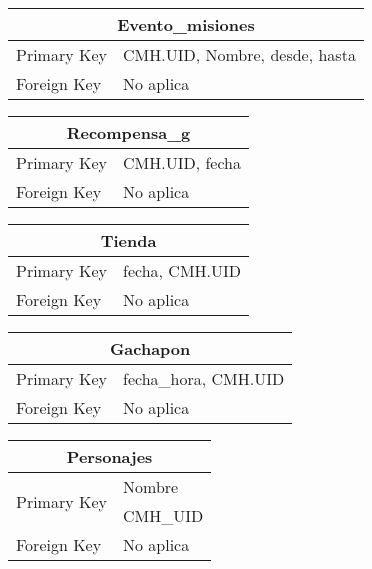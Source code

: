 \documentclass{report}
\begin{document}
\begin{center}    
    \begin{tabular}{|p{3cm}|p{5cm}|}
    \hline
    \multicolumn{2}{|c|}{Evento\_misiones} \\ 
    \hline
    \hline
    Primary Key& CMH.UID, Nombre, desde, hasta\\ 
    \hline
    Foreign Key & No aplica\\ 
    \hline
    \end{tabular}
\end{center}

\begin{center}    
    \begin{tabular}{|p{3cm}|p{5cm}|}
    \hline
    \multicolumn{2}{|c|}{Recompensa\_g} \\ 
    \hline
    \hline
    Primary Key& CMH.UID, fecha\\ 
    \hline
    Foreign Key & No aplica\\ 
    \hline
    \end{tabular}
\end{center}

\begin{center}    
    \begin{tabular}{|p{3cm}|p{5cm}|}
    \hline
    \multicolumn{2}{|c|}{Tienda} \\ 
    \hline
    \hline
    Primary Key& fecha, CMH.UID\\ 
    \hline
    Foreign Key & No aplica\\ 
    \hline
    \end{tabular}
\end{center}

\begin{center}    
    \begin{tabular}{|p{3cm}|p{5cm}|}
    \hline
    \multicolumn{2}{|c|}{Gachapon} \\ 
    \hline
    \hline
    Primary Key& fecha\_hora, CMH.UID\\ 
    \hline
    Foreign Key & No aplica\\ 
    \hline
    \end{tabular}
\end{center}

\begin{center}    
    \begin{tabular}{|p{3cm}|p{5cm}|}
    \hline
    \multicolumn{2}{|c|}{Personajes} \\ 
    \hline
    \hline
    \multirow{2}{4em}{Primary Key}& Nombre\\ & CMH\_UID\\ 
    \hline
    Foreign Key & No aplica\\ 
    \hline
    \end{tabular}
\end{center}
\end{document}
